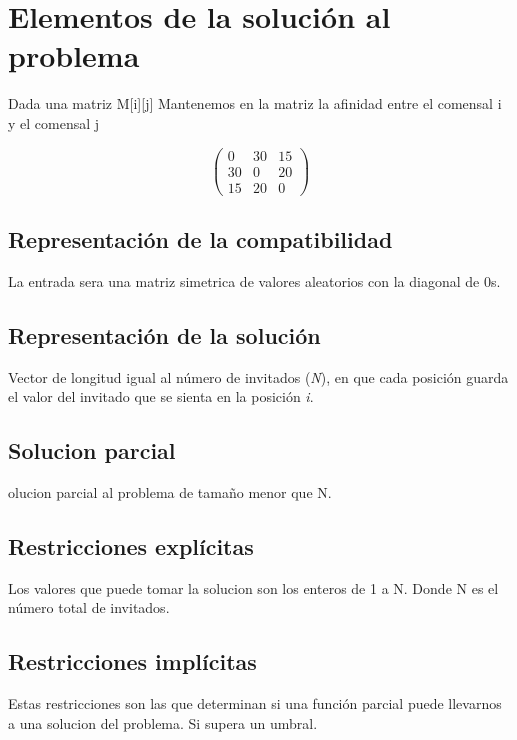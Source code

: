 	


\section{Elementos de la solución al problema}

	Dada una matriz M[i][j] 
	Mantenemos en la matriz la afinidad  entre 
	el comensal i y el comensal j
	
	
	\[ \left( \begin{array}{ccc}
	0 & 30 & 15 \\
	30 & 0 & 20 \\
	15 & 20 & 0 \end{array} \right)\] 



\subsection{Representación de la compatibilidad}
La entrada sera una matriz simetrica de valores aleatorios con la diagonal de 0s.

\subsection{Representación de la solución}
Vector de longitud igual al número de invitados (\textit{N}), en que cada posición guarda el valor del invitado que se sienta en la posición \textit{i}.

\subsection{Solucion parcial}
olucion parcial al problema de tamaño menor que N.


\subsection{Restricciones explícitas}
Los valores que puede tomar la solucion son los enteros de 1 a N. Donde N es el número total de invitados. 

\subsection{Restricciones implícitas}
Estas restricciones son las que determinan si una función parcial puede llevarnos a una solucion del problema. Si supera un umbral. 


